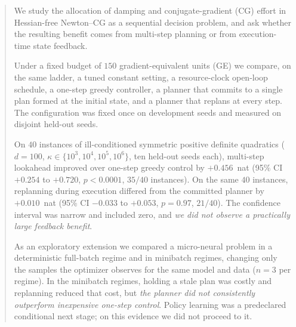 \begin{abstract}
We study the allocation of damping and conjugate-gradient (CG) effort in
Hessian-free Newton--CG \citep{martens2010hessianfree,nash2000survey} as a
sequential decision problem, and ask whether the resulting benefit comes from
multi-step planning or from execution-time state feedback.

Under a fixed budget of $150$ gradient-equivalent units (GE) we compare, on the
same ladder, a tuned constant setting, a resource-clock open-loop schedule, a
one-step greedy controller, a planner that commits to a single plan formed at
the initial state, and a planner that replans at every step. The configuration
was fixed once on development seeds and measured on disjoint held-out seeds.

On $40$ instances of ill-conditioned symmetric positive definite quadratics
($d = 100$, $\kappa \in \{10^3, 10^4, 10^5, 10^6\}$, ten held-out seeds each),
multi-step lookahead improved over one-step greedy control by
$+0.456$~nat (95\% CI $+0.254$ to $+0.720$, $p < 0.0001$, $35/40$ instances).
On the same $40$ instances, replanning during execution differed from the
committed planner by $+0.010$~nat (95\% CI $-0.033$ to $+0.053$, $p = 0.97$,
$21/40$). The confidence interval was narrow and included zero, and
\emph{we did not observe a practically large feedback benefit}.

As an exploratory extension we compared a micro-neural problem in a
deterministic full-batch regime and in minibatch regimes, changing only the
samples the optimizer observes for the same model and data
($n = 3$ per regime). In the minibatch regimes, holding a stale plan was
costly and replanning reduced that cost, but \emph{the planner did not
consistently outperform inexpensive one-step control}. Policy learning was a
predeclared conditional next stage; on this evidence we did not proceed to it.
\end{abstract}
